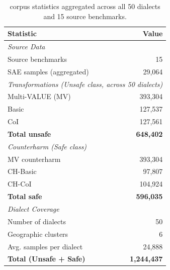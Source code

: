 \begin{table}[t]
\centering
\scriptsize
\begin{tabular}{lr}
\toprule
\textbf{Statistic} & \textbf{Value} \\
\midrule
\multicolumn{2}{l}{\textit{Source Data}} \\
Source benchmarks & 15 \\
SAE samples (aggregated) & 29,064 \\
\midrule
\multicolumn{2}{l}{\textit{Transformations (Unsafe class, across 50 dialects)}} \\
Multi-VALUE (MV) & 393,304 \\
\dllm{} Basic & 127,537 \\
\dllm{} CoI & 127,561 \\
\textbf{Total unsafe} & \textbf{648,402} \\
\midrule
\multicolumn{2}{l}{\textit{Counterharm (Safe class)}} \\
MV counterharm & 393,304 \\
\dllm{} CH-Basic & 97,807 \\
\dllm{} CH-CoI & 104,924 \\
\textbf{Total safe} & \textbf{596,035} \\
\midrule
\multicolumn{2}{l}{\textit{Dialect Coverage}} \\
Number of dialects & 50 \\
Geographic clusters & 6 \\
Avg. samples per dialect & 24,888 \\
\midrule
\textbf{Total \dataset{} (Unsafe + Safe)} & \textbf{1,244,437} \\
\bottomrule
\end{tabular}
\caption{\dataset{} corpus statistics aggregated across all 50 dialects and 15 source benchmarks.}
\label{tab:shield_stats}
\end{table}